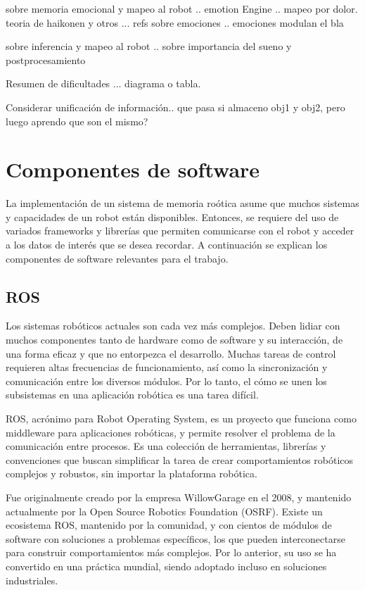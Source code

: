 sobre memoria emocional y mapeo al robot
.. emotion Engine \cite{Kasap2010}
.. mapeo por dolor. teoria de haikonen y otros \cite{Dodd2005}
... refs sobre emociones \cite{Deutsch2008}
.. emociones modulan el bla \cite{Deutsch2008}

sobre inferencia y mapeo al robot
.. sobre importancia del sueno y postprocesamiento \cite{Kelley2014}

Resumen de dificultades ... diagrama o tabla.



Considerar unificaci\'on de informaci\'on.. que pasa si almaceno obj1 y obj2, pero luego aprendo que son el mismo?



\section{Componentes de software}

La implementaci\'on de un sistema de memoria ro\'otica asume que muchos sistemas y capacidades de un robot est\'an disponibles. Entonces, se requiere del uso de variados frameworks y librer\'ias que permiten comunicarse con el robot y acceder a los datos de inter\'es que se desea recordar. A continuaci\'on se explican los componentes de software relevantes para el trabajo.

\subsection{ROS}

Los sistemas rob\'oticos actuales son cada vez m\'as complejos. Deben lidiar con muchos componentes tanto de hardware como de software y su interacci\'on, de una forma eficaz y que no entorpezca el desarrollo. Muchas tareas de control requieren altas frecuencias de funcionamiento, as\'i como la sincronizaci\'on y comunicaci\'on entre los diversos m\'odulos. Por lo tanto, el c\'omo se unen los subsistemas en una aplicaci\'on rob\'otica es una tarea dif\'icil.

ROS\cite{ROS:2009}, acr\'onimo para Robot Operating System, es un proyecto que funciona como middleware para aplicaciones rob\'oticas, y permite resolver el problema de la comunicaci\'on entre procesos. Es una colecci\'on de herramientas, librer\'ias y convenciones que buscan simplificar la tarea de crear comportamientos rob\'oticos complejos y robustos, sin importar la plataforma rob\'otica.

Fue originalmente creado por la empresa WillowGarage en el 2008, y mantenido actualmente por la Open Source Robotics Foundation (OSRF). Existe un ecosistema ROS, mantenido por la comunidad, y con cientos de m\'odulos de software con soluciones a problemas espec\'ificos, los que pueden interconectarse para construir comportamientos m\'as complejos. Por lo anterior, su uso se ha convertido en una pr\'actica mundial, siendo adoptado incluso en soluciones industriales.

